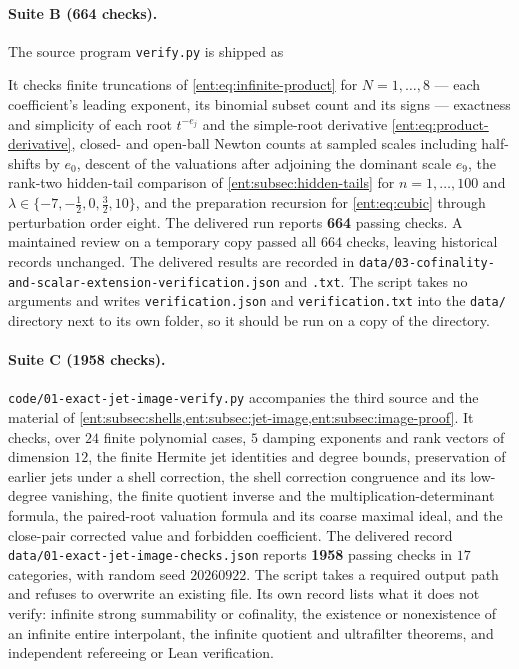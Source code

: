 \documentclass[11pt]{article}
\theoremstyle{plain}
\theoremstyle{plain}
\theoremstyle{plain}
\theoremstyle{definition}
\theoremstyle{definition}
\theoremstyle{definition}
\theoremstyle{definition}
\theoremstyle{remark}
\begin{document}
\paragraph{Suite B (664 checks).}
The source program \texttt{verify.py} is shipped as
\begin{quote}\small
{}
\end{quote}
It checks finite truncations of
\eqref{ent:eq:infinite-product} for $N=1,\ldots,8$ --- each coefficient's
leading exponent, its binomial subset count and its signs --- exactness and
simplicity of each root $t^{-e_j}$ and the simple-root derivative
\eqref{ent:eq:product-derivative}, closed- and open-ball Newton counts at
sampled scales including half-shifts by $e_0$, descent of the valuations
after adjoining the dominant scale $e_9$, the rank-two hidden-tail comparison
of \cref{ent:subsec:hidden-tails} for $n=1,\ldots,100$ and
$\lambda\in\{-7,-\tfrac12,0,\tfrac32,10\}$, and the preparation recursion for
\eqref{ent:eq:cubic} through perturbation order eight. The delivered run
reports \textbf{664} passing checks. A maintained review on a temporary copy
passed all $664$ checks, leaving historical records unchanged. The delivered
results are recorded in
\texttt{data/03-cofinality-and-scalar-extension-verification.json} and
\texttt{.txt}. The script takes no arguments and writes
\texttt{verification.json} and \texttt{verification.txt} into the
\texttt{data/} directory next to its own folder, so it should be run on a
copy of the directory.

\paragraph{Suite C (1958 checks).}
\texttt{code/01-exact-jet-image-verify.py} accompanies the third source and
the material of \cref{ent:subsec:shells,ent:subsec:jet-image,ent:subsec:image-proof}.
It checks, over $24$ finite polynomial cases, $5$ damping exponents and rank
vectors of dimension $12$, the finite Hermite jet identities and degree
bounds, preservation of earlier jets under a shell correction, the shell
correction congruence and its low-degree vanishing, the finite quotient
inverse and the multiplication-determinant formula, the paired-root
valuation formula and its coarse maximal ideal, and the close-pair corrected
value and forbidden coefficient. The delivered record
\texttt{data/01-exact-jet-image-checks.json} reports \textbf{1958} passing
checks in $17$ categories, with random seed $20260922$. The script takes a
required output path and refuses to overwrite an existing file. Its own
record lists what it does not verify: infinite strong summability or
cofinality, the existence or nonexistence of an infinite entire interpolant,
the infinite quotient and ultrafilter theorems, and independent refereeing or
Lean verification.
\end{document}
